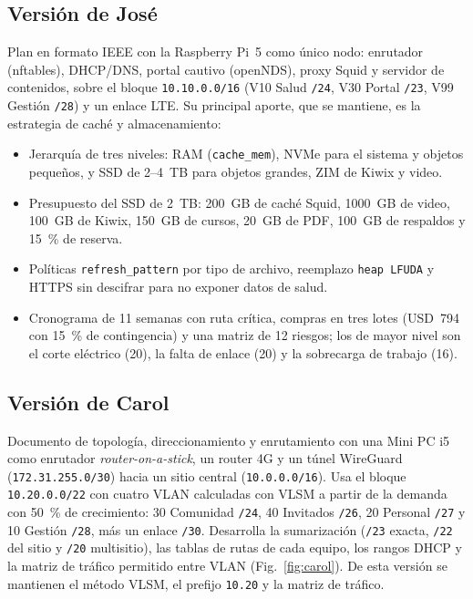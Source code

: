 \documentclass[conference]{IEEEtran}
\begin{document}
\subsection{Versión de José}\label{sec:jose}
Plan en formato IEEE con la Raspberry Pi~5 como único nodo: enrutador (nftables), DHCP/DNS, portal cautivo (openNDS), proxy Squid y servidor de contenidos, sobre el bloque \texttt{10.10.0.0/16} (V10 Salud \texttt{/24}, V30 Portal \texttt{/23}, V99 Gestión \texttt{/28}) y un enlace LTE. Su principal aporte, que se mantiene, es la estrategia de caché y almacenamiento:
\begin{itemize}
\item Jerarquía de tres niveles: RAM (\texttt{cache\_mem}), NVMe para el sistema y objetos pequeños, y SSD de 2--4~TB para objetos grandes, ZIM de Kiwix y video.
\item Presupuesto del SSD de 2~TB: 200~GB de caché Squid, 1000~GB de video, 100~GB de Kiwix, 150~GB de cursos, 20~GB de PDF, 100~GB de respaldos y 15~\% de reserva.
\item Políticas \texttt{refresh\_pattern} por tipo de archivo, reemplazo \texttt{heap LFUDA} y HTTPS sin descifrar para no exponer datos de salud.
\item Cronograma de 11 semanas con ruta crítica, compras en tres lotes (USD~794 con 15~\% de contingencia) y una matriz de 12 riesgos; los de mayor nivel son el corte eléctrico (20), la falta de enlace (20) y la sobrecarga de trabajo (16).
\end{itemize}

\subsection{Versión de Carol}
Documento de topología, direccionamiento y enrutamiento con una Mini PC i5 como enrutador \textit{router-on-a-stick}, un router 4G y un túnel WireGuard (\texttt{172.31.255.0/30}) hacia un sitio central (\texttt{10.0.0.0/16}). Usa el bloque \texttt{10.20.0.0/22} con cuatro VLAN calculadas con VLSM a partir de la demanda con 50~\% de crecimiento: 30 Comunidad \texttt{/24}, 40 Invitados \texttt{/26}, 20 Personal \texttt{/27} y 10 Gestión \texttt{/28}, más un enlace \texttt{/30}. Desarrolla la sumarización (\texttt{/23} exacta, \texttt{/22} del sitio y \texttt{/20} multisitio), las tablas de rutas de cada equipo, los rangos DHCP y la matriz de tráfico permitido entre VLAN (Fig.~\ref{fig:carol}). De esta versión se mantienen el método VLSM, el prefijo \texttt{10.20} y la matriz de tráfico.
\end{document}
